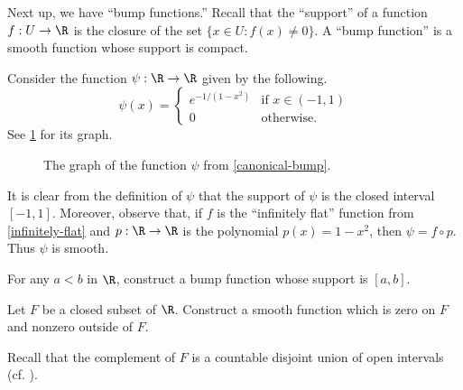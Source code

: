 Next up, we have ``bump functions.'' Recall that the ``support'' of a function $f : U \to \R$ is the closure of the set $\{ x \in U : f(x) \neq 0 \}$. A ``bump function'' is a smooth function whose support is compact. 

\begin{example} \label{canonical-bump}
	Consider the function $\psi : \R \to \R$ given by the following. 
	\[ \psi(x) = \begin{cases} e^{-1/(1-x^2)} & \text{if } x \in (-1,1) \\ 0 & \text{otherwise}. \end{cases} \]
	See \cref{canonical-bump-graph} for its graph. 
	\begin{figure}
		\begin{center}
		\end{center}
		\caption{The graph of the function $\psi$ from \cref{canonical-bump}.}  \label{canonical-bump-graph}
	\end{figure}
	It is clear from the definition of $\psi$ that the support of $\psi$ is the closed interval $[-1,1]$. Moreover, observe that, if $f$ is the ``infinitely flat'' function from \cref{infinitely-flat} and $p : \R \to \R$ is the polynomial $p(x) = 1-x^2$, then $\psi = f \circ p$. Thus $\psi$ is smooth. 
\end{example}

\begin{exercise}
	For any $a < b$ in $\R$, construct a bump function whose support is $[a,b]$. 
\end{exercise}

\begin{exercise}
	Let $F$ be a closed subset of $\R$. Construct a smooth function which is zero on $F$ and nonzero outside of $F$. \begin{hint} Recall that the complement of $F$ is a countable disjoint union of open intervals (cf. \cite[theorem 6.17]{protter-morrey}). \end{hint}
\end{exercise}

